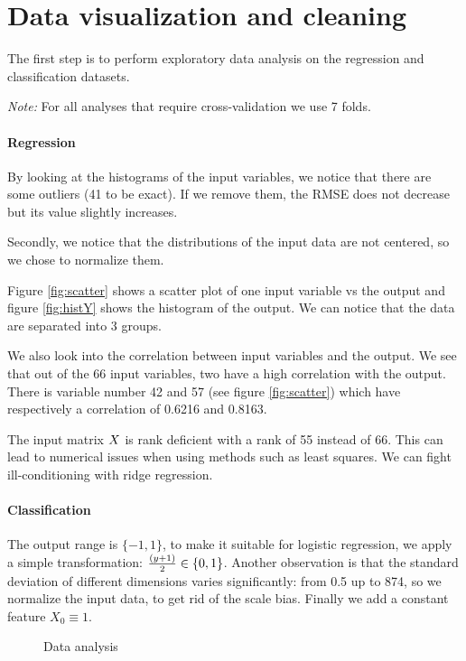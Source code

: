 \documentclass{article} %
\begin{document}
\section{Data visualization and cleaning}

The first step is to perform exploratory data analysis on the regression and classification datasets.

\emph{Note:} For all analyses that require cross-validation we use 7 folds. 

\paragraph{Regression} 
By looking at the histograms of the input variables, we notice that there are some outliers (41 to be exact). 
If we remove them, the RMSE does not decrease but its value slightly increases.

Secondly, we notice that the distributions of the input data are not centered, so we chose to normalize them.

Figure \ref{fig:scatter} shows a scatter plot of one input variable vs the output and figure \ref{fig:histY} shows the histogram of the output.
We can notice that the data are separated into 3 groups. 

We also look into the correlation between input variables and the output. We see that out of the 66 input variables, two have a high correlation with the output. There is variable number 42 and 57 (see figure \ref{fig:scatter}) which have respectively a correlation of 0.6216 and 0.8163.

The input matrix $\boldmath{X}$ is rank deficient with a rank of 55 instead of 66. This can lead to numerical issues when using methods such as least squares.
We can fight ill-conditioning with ridge regression. 

\paragraph{Classification}
The output range is $\{-1, 1\}$, to make it suitable for logistic regression, we apply a simple transformation: ${(y + 1)\over 2} \in \{0, 1\}$. Another observation is that the standard deviation of different dimensions varies significantly: from 0.5 up to 874, so we normalize the input data, to get rid of the scale bias. Finally we add a constant feature $X_0 \equiv 1$.

\begin{figure}[!t]
	\centering
	\caption{Data analysis}
\end{figure}
\end{document}
